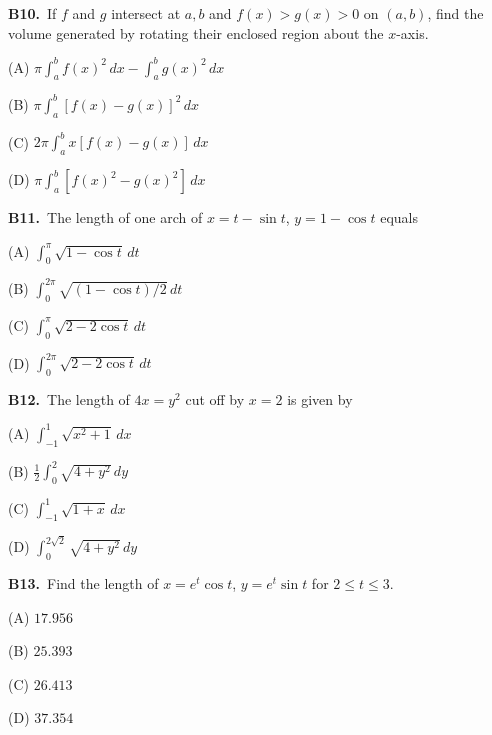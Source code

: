\documentclass[11pt]{article}
\begin{document}
\bigskip\noindent\textbf{B10.}\ If $f$ and $g$ intersect at $a,b$ and $f(x)>g(x)>0$ on $(a,b)$, find the volume generated by rotating their enclosed region about the $x$-axis.
\begin{list}{}{\setlength{\leftmargin}{3em}\setlength{\labelwidth}{2.5em}\setlength{\itemsep}{0pt}\setlength{\topsep}{2pt}}
\item[(A)] $\pi\int_a^bf(x)^2\,dx-\int_a^bg(x)^2\,dx$
\item[(B)] $\pi\int_a^b[f(x)-g(x)]^2\,dx$
\item[(C)] $2\pi\int_a^bx[f(x)-g(x)]\,dx$
\item[(D)] $\pi\int_a^b[f(x)^2-g(x)^2]\,dx$
\end{list}

\bigskip\noindent\textbf{B11.}\ The length of one arch of $x=t-\sin t$, $y=1-\cos t$ equals
\begin{list}{}{\setlength{\leftmargin}{3em}\setlength{\labelwidth}{2.5em}\setlength{\itemsep}{0pt}\setlength{\topsep}{2pt}}
\item[(A)] $\int_0^\pi\sqrt{1-\cos t}\,dt$
\item[(B)] $\int_0^{2\pi}\sqrt{(1-\cos t)/2}\,dt$
\item[(C)] $\int_0^\pi\sqrt{2-2\cos t}\,dt$
\item[(D)] $\int_0^{2\pi}\sqrt{2-2\cos t}\,dt$
\end{list}

\bigskip\noindent\textbf{B12.}\ The length of $4x=y^2$ cut off by $x=2$ is given by
\begin{list}{}{\setlength{\leftmargin}{3em}\setlength{\labelwidth}{2.5em}\setlength{\itemsep}{0pt}\setlength{\topsep}{2pt}}
\item[(A)] $\int_{-1}^1\sqrt{x^2+1}\,dx$
\item[(B)] $\tfrac12\int_0^2\sqrt{4+y^2}\,dy$
\item[(C)] $\int_{-1}^1\sqrt{1+x}\,dx$
\item[(D)] $\int_0^{2\sqrt2}\sqrt{4+y^2}\,dy$
\end{list}

\bigskip\noindent\textbf{B13.}\ Find the length of $x=e^t\cos t$, $y=e^t\sin t$ for $2\le t\le3$.
\begin{list}{}{\setlength{\leftmargin}{3em}\setlength{\labelwidth}{2.5em}\setlength{\itemsep}{0pt}\setlength{\topsep}{2pt}}
\item[(A)] $17.956$
\item[(B)] $25.393$
\item[(C)] $26.413$
\item[(D)] $37.354$
\end{list}
\end{document}
